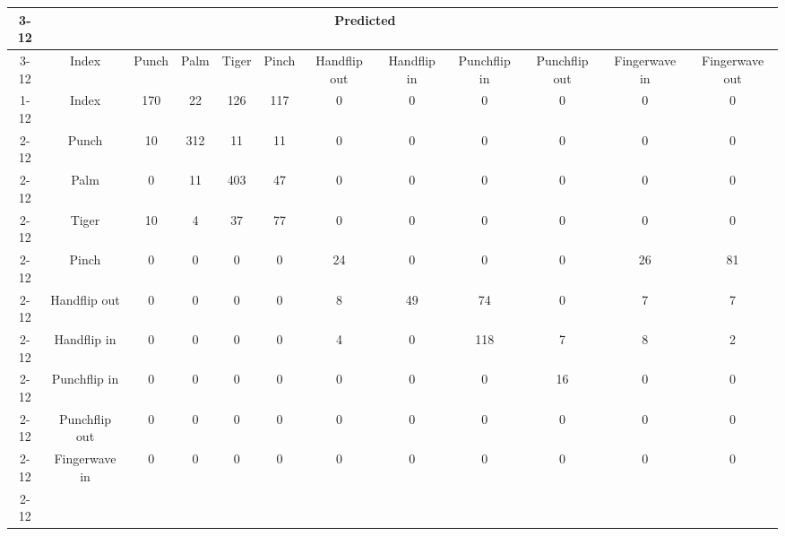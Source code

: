 \documentclass{standalone}
\begin{document}
 
 \begin{tabular}{|c |c |c |c |c |c |c |c |c |c |c |c |}
\cline{3-12}\multicolumn{2}{c|}{} & \multicolumn{10}{c|}{Predicted} \\ 
\cline{3-12} \multicolumn{2}{c |}{ } & Index & Punch & Palm & Tiger & Pinch & Handflip out & Handflip in & Punchflip in & Punchflip out & Fingerwave in & Fingerwave out\\ 
\cline{1-12}\multirow{10}{*}{\rotatebox[origin=c]{90}{Actual}} & Index & 170 & 22 & 126 & 117 & 0 & 0 & 0 & 0 & 0 & 0\\ 
 \cline{2-12} & Punch & 10 & 312 & 11 & 11 & 0 & 0 & 0 & 0 & 0 & 0\\ 
 \cline{2-12} & Palm & 0 & 11 & 403 & 47 & 0 & 0 & 0 & 0 & 0 & 0\\ 
 \cline{2-12} & Tiger & 10 & 4 & 37 & 77 & 0 & 0 & 0 & 0 & 0 & 0\\ 
 \cline{2-12} & Pinch & 0 & 0 & 0 & 0 & 24 & 0 & 0 & 0 & 26 & 81\\ 
 \cline{2-12} & Handflip out & 0 & 0 & 0 & 0 & 8 & 49 & 74 & 0 & 7 & 7\\ 
 \cline{2-12} & Handflip in & 0 & 0 & 0 & 0 & 4 & 0 & 118 & 7 & 8 & 2\\ 
 \cline{2-12} & Punchflip in & 0 & 0 & 0 & 0 & 0 & 0 & 0 & 16 & 0 & 0\\ 
 \cline{2-12} & Punchflip out & 0 & 0 & 0 & 0 & 0 & 0 & 0 & 0 & 0 & 0\\ 
 \cline{2-12} & Fingerwave in & 0 & 0 & 0 & 0 & 0 & 0 & 0 & 0 & 0 & 0\\ 
 \cline{2-12}\hline \end{tabular}
 
\end{document}
